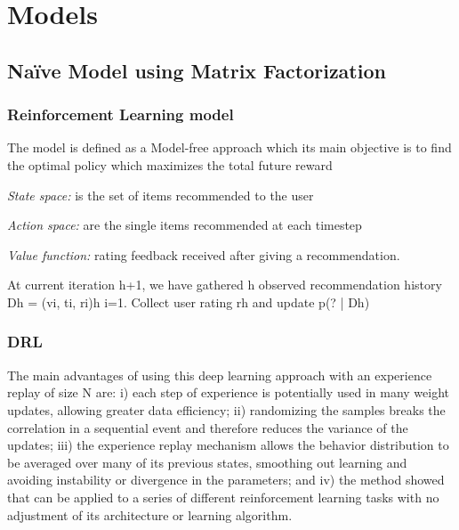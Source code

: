 \chapter{Models}
\label{sec:chapterlabel3}

\section{Na\"{i}ve Model using Matrix Factorization}



\subsection{Reinforcement Learning model}

The model is defined as a Model-free approach which its main objective is to find the optimal policy which maximizes the total future reward

\textit{State space:} is the set of items recommended to the user

\textit{Action space:} are the single items recommended at each timestep

\textit{Value function:} rating feedback received after giving a recommendation.



At current iteration h+1, we have gathered h observed recommendation history Dh = {(vi, ti, ri)}h
i=1.
Collect user rating rh and update p(? | Dh)

\subsection{DRL}

The main advantages of using this deep learning approach with an experience replay of size N are: i) each step of experience is potentially used in many weight updates, allowing greater data efficiency; ii) randomizing the samples breaks the correlation in a sequential event and therefore reduces the variance of the updates; iii) the experience replay mechanism allows the behavior distribution to be averaged over many of its previous states, smoothing out learning and avoiding instability or divergence in the parameters; and iv) the method showed that can be applied to a series of different reinforcement learning tasks with no adjustment of its architecture or learning algorithm.


